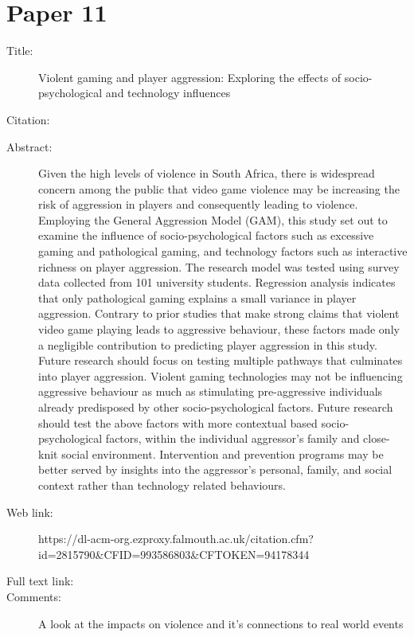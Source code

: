 \documentclass{scrartcl}
\begin{document}
\section*{Paper 11}
\begin{description}
\item[Title:] 
Violent gaming and player aggression: Exploring the effects of socio-psychological and technology influences
\item[Citation:] \cite{}
\item[Abstract:] Given the high levels of violence in South Africa, there is widespread concern among the public that video game violence may be increasing the risk of aggression in players and consequently leading to violence. Employing the General Aggression Model (GAM), this study set out to examine the influence of socio-psychological factors such as excessive gaming and pathological gaming, and technology factors such as interactive richness on player aggression. The research model was tested using survey data collected from 101 university students. Regression analysis indicates that only pathological gaming explains a small variance in player aggression. Contrary to prior studies that make strong claims that violent video game playing leads to aggressive behaviour, these factors made only a negligible contribution to predicting player aggression in this study. Future research should focus on testing multiple pathways that culminates into player aggression. Violent gaming technologies may not be influencing aggressive behaviour as much as stimulating pre-aggressive individuals already predisposed by other socio-psychological factors. Future research should test the above factors with more contextual based socio-psychological factors, within the individual aggressor's family and close-knit social environment. Intervention and prevention programs may be better served by insights into the aggressor's personal, family, and social context rather than technology related behaviours.
\item[Web link:] https://dl-acm-org.ezproxy.falmouth.ac.uk/citation.cfm?id=2815790&CFID=993586803&CFTOKEN=94178344
\item[Full text link:] 
\item[Comments:]  A look at the impacts on violence and it's connections to real world events
\end{description}
\end{document}

